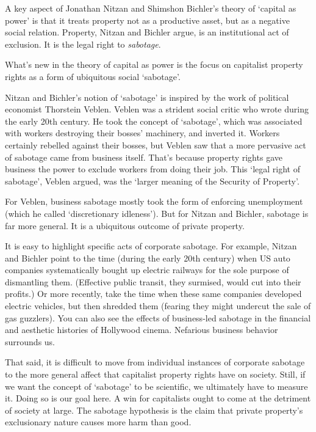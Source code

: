 \documentclass[
]{book}
\begin{document}
A key aspect of Jonathan Nitzan and Shimshon Bichler's theory of `capital as power' is that it treats property not as a productive asset, but as a negative social relation. Property, Nitzan and Bichler argue, is an institutional act of exclusion. It is the legal right to \emph{sabotage}.

What's new in the theory of capital as power is the focus on capitalist property rights as a form of ubiquitous social `sabotage'.

Nitzan and Bichler's notion of `sabotage' is inspired by the work of political economist Thorstein Veblen. Veblen was a strident social critic who wrote during the early 20th century. He took the concept of `sabotage', which was associated with workers destroying their bosses' machinery, and inverted it. Workers certainly rebelled against their bosses, but Veblen saw that a more pervasive act of sabotage came from business itself. That's because property rights gave business the power to exclude workers from doing their job. This `legal right of sabotage', Veblen argued, was the `larger meaning of the Security of Property'.

For Veblen, business sabotage mostly took the form of enforcing unemployment (which he called `discretionary idleness'). But for Nitzan and Bichler, sabotage is far more general. It is a ubiquitous outcome of private property.

It is easy to highlight specific acts of corporate sabotage. For example, Nitzan and Bichler point to the time (during the early 20th century) when US auto companies systematically bought up electric railways for the sole purpose of dismantling them. (Effective public transit, they surmised, would cut into their profits.) Or more recently, take the time when these same companies developed electric vehicles, but then shredded them (fearing they might undercut the sale of gas guzzlers). You can also see the effects of business-led sabotage in the financial and aesthetic histories of Hollywood cinema. Nefarious business behavior surrounds us.

That said, it is difficult to move from individual instances of corporate sabotage to the more general affect that capitalist property rights have on society. Still, if we want the concept of `sabotage' to be scientific, we ultimately have to measure it. Doing so is our goal here.
A win for capitalists ought to come at the detriment of society at large.
The sabotage hypothesis is the claim that private property's exclusionary nature causes more harm than good.
\end{document}
